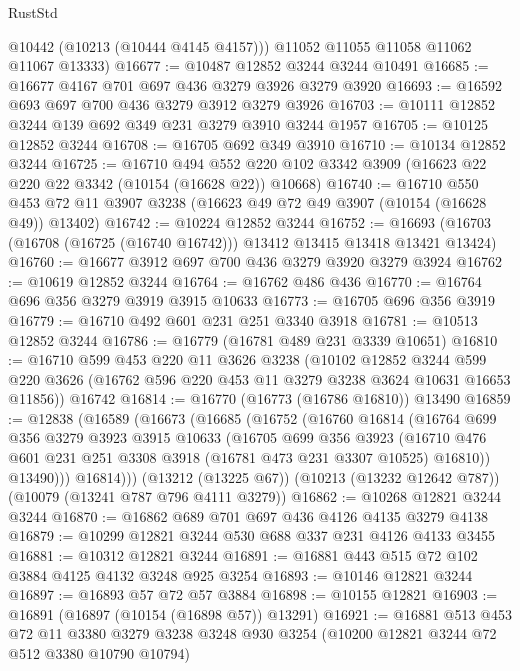 \begin{lexlean}{RustStd}
\begin{coremodule}
{\begin{coremodule}
{{{{{{{{{{{{{{{{{{{{{{{{{{        @10442
        (@10213 (@10444 @4145 @4157)))
      @11052
      @11055
      @11058
      @11062
      @11067
      @13333)
@16677 := @10487 @12852 @3244 @3244 @10491
@16685 := @16677 @4167 @701 @697 @436 @3279 @3926 @3279 @3920
@16693 := @16592 @693 @697 @700 @436 @3279 @3912 @3279 @3926
@16703 := @10111 @12852 @3244 @139 @692 @349 @231 @3279 @3910 @3244 @1957
@16705 := @10125 @12852 @3244
@16708 := @16705 @692 @349 @3910
@16710 := @10134 @12852 @3244
@16725 := @16710
    @494
    @552
    @220
    @102
    @3342
    @3909
    (@16623 @22 @220 @22 @3342 (@10154 (@16628 @22)) @10668)
@16740 := @16710
    @550
    @453
    @72
    @11
    @3907
    @3238
    (@16623 @49 @72 @49 @3907 (@10154 (@16628 @49)) @13402)
@16742 := @10224 @12852 @3244
@16752 := @16693 (@16703 (@16708 (@16725 (@16740 @16742))) @13412 @13415 @13418 @13421 @13424)
@16760 := @16677 @3912 @697 @700 @436 @3279 @3920 @3279 @3924
@16762 := @10619 @12852 @3244
@16764 := @16762 @486 @436
@16770 := @16764 @696 @356 @3279 @3919 @3915 @10633
@16773 := @16705 @696 @356 @3919
@16779 := @16710 @492 @601 @231 @251 @3340 @3918
@16781 := @10513 @12852 @3244
@16786 := @16779 (@16781 @489 @231 @3339 @10651)
@16810 := @16710
    @599
    @453
    @220
    @11
    @3626
    @3238
    (@10102
      @12852
      @3244
      @599
      @220
      @3626
      (@16762 @596 @220 @453 @11 @3279 @3238 @3624 @10631 @16653 @11856))
    @16742
@16814 := @16770 (@16773 (@16786 @16810)) @13490
@16859 := @12838
    (@16589
      (@16673
        (@16685
          (@16752
            (@16760
              @16814
              (@16764
                @699
                @356
                @3279
                @3923
                @3915
                @10633
                (@16705
                  @699
                  @356
                  @3923
                  (@16710 @476 @601 @231 @251 @3308 @3918 (@16781 @473 @231 @3307 @10525) @16810))
                @13490)))
          @16814)))
    (@13212 (@13225 @67))
    (@10213 (@13232 @12642 @787))
    (@10079 (@13241 @787 @796 @4111 @3279))
@16862 := @10268 @12821 @3244 @3244
@16870 := @16862 @689 @701 @697 @436 @4126 @4135 @3279 @4138
@16879 := @10299 @12821 @3244 @530 @688 @337 @231 @4126 @4133 @3455
@16881 := @10312 @12821 @3244
@16891 := @16881 @443 @515 @72 @102 @3884 @4125 @4132 @3248 @925 @3254
@16893 := @10146 @12821 @3244
@16897 := @16893 @57 @72 @57 @3884
@16898 := @10155 @12821
@16903 := @16891 (@16897 (@10154 (@16898 @57)) @13291)
@16921 := @16881
    @513
    @453
    @72
    @11
    @3380
    @3279
    @3238
    @3248
    @930
    @3254
    (@10200 @12821 @3244 @72 @512 @3380 @10790 @10794)
}}}}}}}}}}}}}}}}}}}}}}}}}}
\end{coremodule}}
\end{coremodule}
\end{lexlean}

